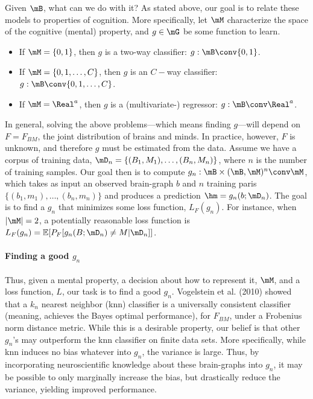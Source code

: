 Given $\mB$, what can we do with it?  As stated above, our goal is to relate these models to properties of cognition. More specifically, let $\mM$ characterize the space of the cognitive (mental) property, and $g \in \mG$ be some function to learn.  

\begin{itemize}
	\item If $\mM=\{0,1\}$, then $g$ is a two-way classifier: $g: \mB \conv \{0,1\}$.
	\item If $\mM=\{0,1,\ldots, C\}$, then $g$ is an $C-$way classifier: $g: \mB \conv \{0,1,\ldots,C\}$.
	\item If $\mM=\Real^a$, then $g$ is a (multivariate-) regressor: $g: \mB \conv \Real^a$.  
\end{itemize}

In general, solving the above problems---which means finding $g$---will depend on $F=F_{BM}$, the joint distribution of brains and minds.  In practice, however, $F$ is unknown, and therefore $g$ must be estimated from the data. Assume we have a corpus of training data, $\mD_n=\{(B_1,M_1), \ldots, (B_n, M_n)\}$, where $n$ is the number of training samples.  Our goal then is to compute $g_n: \mB \times (\mB, \mM)^n \conv \mM$, which takes as input an observed brain-graph $b$ and $n$ training paris $\{(b_1,m_1), \ldots, (b_n,m_n)\}$ and produces a prediction $\hm=g_n(b; \mD_n)$.  The goal is to find a $g_n$ that minimizes some loss function, $L_F(g_n)$.  For instance, when $|\mM|=2$, a potentially reasonable loss function is $L_F(g_n)=\mathbb{E}[P_F[g_n(B;\mD_n) \neq M | \mD_n]]$.

\paragraph{Finding a good $g_n$}

Thus, given a mental property, a decision about how to represent it, $\mM$, and a loss function, $L$, our task is to find a good $g_n$.  Vogelstein et al. (2010) showed that a $k_n$ nearest neighbor (knn) classifier is a universally consistent classifier (meaning, achieves the Bayes optimal performance), for $F_{BM}$, under a Frobenius norm distance metric.  While this is a desirable property, our belief is that other $g_n$'s may outperform the knn classifier on finite data sets.  More specifically, while knn induces no bias whatever into $g_n$, the variance is large.  Thus, by incorporating neuroscientific knowledge about these brain-graphs into $g_n$, it may be possible to only marginally increase the bias, but drastically reduce the variance, yielding improved performance.  

